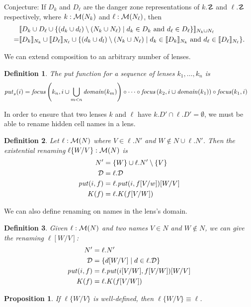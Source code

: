 \documentclass{article}
\newtheorem{definition}{Definition}
\newtheorem{proposition}{Proposition}
\begin{document}
Conjecture: If $D_k$ and $D_\ell$ are the danger zone representations of 
    $k.\danger$ and $\ell.\danger$ respectively, where
    $k:\mathcal M(N_k)$ and $\ell:\mathcal M(N_\ell)$, then 
    \begin{align*}
        &\llbracket D_k \cup D_\ell \cup \{(d_k \cup d_l) \setminus (N_k \cup N_\ell) \mid d_k \in D_k \text{ and } d_\ell \in D_\ell\} \rrbracket_{N_k \cup N_\ell} \\
        = &\llbracket D_k \rrbracket_{N_k} \cup \llbracket D_\ell \rrbracket_{N_\ell} \cup 
        \{(d_k \cup d_l) \setminus (N_k \cup N_\ell) \mid d_k \in \llbracket D_k \rrbracket_{N_k} 
                                           \text{ and } d_\ell \in \llbracket D_\ell \rrbracket_{N_\ell}\}.
    \end{align*}

We can extend composition to an arbitrary number of lenses. 
\begin{definition}
    The put function for a sequence of lenses $k_1,\ldots,k_n$ is
    \begin{align*}
        \mathit{put}_s(i) &= \mathit{focus}\left(k_n,i \cup \bigcup_{m < n}\mathit{domain}(k_m)\right)
            \circ \cdots \circ \mathit{focus}\left(k_2, i \cup \mathit{domain}(k_1)\right) \circ \mathit{focus}(k_1,i)
    \end{align*}
\end{definition}

In order to ensure that two lenses $k$ and $\ell$ have $k.D' \cap \ell.D' = \emptyset$,
we must be able to rename hidden cell names in a lens.
\begin{definition}
    Let $\ell : \mathcal M(N)$ where $V \in \ell.N'$ and $W \notin N \cup \ell.N'$. 
    Then the existential renaming $\ell\{W/V\} : \mathcal M(N)$ is
    \begin{align*}
        N' &= \{W\} \cup \ell.N' \setminus \{V\} \\
        \mathcal D &= \ell.\mathcal D \\
        \mathit{put}(i,f) &= \ell.\mathit{put}(i,f[V/w])[W/V] \\
        K(f) &= \ell.K(f[V/W])
    \end{align*}
\end{definition}
We can also define renaming on names in the lens's domain.
\begin{definition}
    Given $\ell : \mathcal M(N)$ and two names $V \in N$ and $W \notin N$, we can
    give the renaming $\ell[W/V]$:
    \begin{align*}
        N' &= \ell.N' \\
        \mathcal D &= \{d[W/V] \mid d \in \ell.\mathcal D\} \\
        \mathit{put}(i,f) &= \ell.\mathit{put}(i[V/W], f[V/W])[W/V] \\
        K(f) &= \ell.K(f[V/W])
    \end{align*}
\end{definition}
\begin{proposition}
    If $\ell\{W/V\}$ is well-defined, then $\ell\{W/V\} \equiv \ell$.
\end{proposition}
\end{document}

